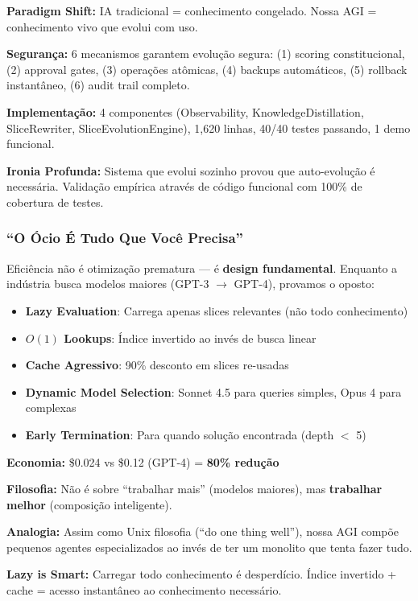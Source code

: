 \documentclass[11pt]{article}
\begin{document}
\textbf{Paradigm Shift:} IA tradicional = conhecimento congelado. Nossa AGI = conhecimento vivo que evolui com uso.

\textbf{Segurança:} 6 mecanismos garantem evolução segura: (1) scoring constitucional, (2) approval gates, (3) operações atômicas, (4) backups automáticos, (5) rollback instantâneo, (6) audit trail completo.

\textbf{Implementação:} 4 componentes (Observability, KnowledgeDistillation, SliceRewriter, SliceEvolutionEngine), 1,620 linhas, 40/40 testes passando, 1 demo funcional.

\textbf{Ironia Profunda:} Sistema que evolui sozinho provou que auto-evolução é necessária. Validação empírica através de código funcional com 100\% de cobertura de testes.

\subsubsection{``O Ócio É Tudo Que Você Precisa''}

Eficiência não é otimização prematura --- é \textbf{design fundamental}. Enquanto a indústria busca modelos maiores (GPT-3 $\rightarrow$ GPT-4), provamos o oposto:

\begin{itemize}
    \item \textbf{Lazy Evaluation}: Carrega apenas slices relevantes (não todo conhecimento)
    \item \textbf{$O(1)$ Lookups}: Índice invertido ao invés de busca linear
    \item \textbf{Cache Agressivo}: 90\% desconto em slices re-usadas
    \item \textbf{Dynamic Model Selection}: Sonnet 4.5 para queries simples, Opus 4 para complexas
    \item \textbf{Early Termination}: Para quando solução encontrada (depth $<$ 5)
\end{itemize}

\textbf{Economia:} \$0.024 vs \$0.12 (GPT-4) = \textbf{80\% redução}

\textbf{Filosofia:} Não é sobre ``trabalhar mais'' (modelos maiores), mas \textbf{trabalhar melhor} (composição inteligente).

\textbf{Analogia:} Assim como Unix filosofia (``do one thing well''), nossa AGI compõe pequenos agentes especializados ao invés de ter um monolito que tenta fazer tudo.

\textbf{Lazy is Smart:} Carregar todo conhecimento é desperdício. Índice invertido + cache = acesso instantâneo ao conhecimento necessário.
\end{document}
